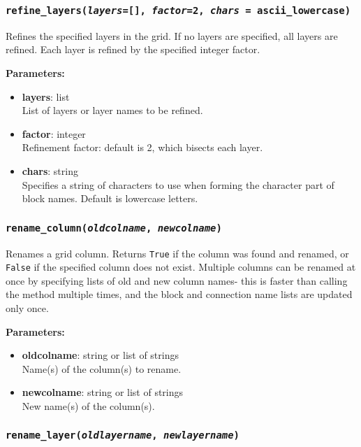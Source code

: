 \subsubsection{\texttt{refine\_layers(\emph{layers}=[], \emph{factor}=2, \emph{chars} = ascii\_lowercase)}}
\label{sec:refine_layers}

Refines the specified layers in the grid.  If no layers are specified, all layers are refined.  Each layer is refined by the specified integer factor.

\textbf{Parameters:}
\begin{itemize}
  \item \textbf{layers}: list\\
    List of layers or layer names to be refined.
  \item \textbf{factor}: integer\\
    Refinement factor: default is 2, which bisects each layer.
  \item \textbf{chars}: string\\
    Specifies a string of characters to use when forming the character part of block names.  Default is lowercase letters.
\end{itemize}

\subsubsection{\texttt{rename\_column(\emph{oldcolname}, \emph{newcolname})}}
\label{sec:rename_column}

Renames a grid column.  Returns \texttt{True} if the column was found and renamed, or \texttt{False} if the specified column does not exist.  Multiple columns can be renamed at once by specifying lists of old and new column names- this is faster than calling the method multiple times, and the block and connection name lists are updated only once.

\textbf{Parameters:}
\begin{itemize}
  \item \textbf{oldcolname}: string or list of strings\\
    Name(s) of the column(s) to rename.
  \item \textbf{newcolname}: string or list of strings\\
    New name(s) of the column(s).
\end{itemize}

\subsubsection{\texttt{rename\_layer(\emph{oldlayername}, \emph{newlayername})}}
\label{sec:rename_layer}

